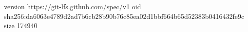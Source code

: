 version https://git-lfs.github.com/spec/v1
oid sha256:da6063e4789d2ad7b6cb28b90b76c85ea02d1bbf664b65d52383b0416432fe9c
size 174940
